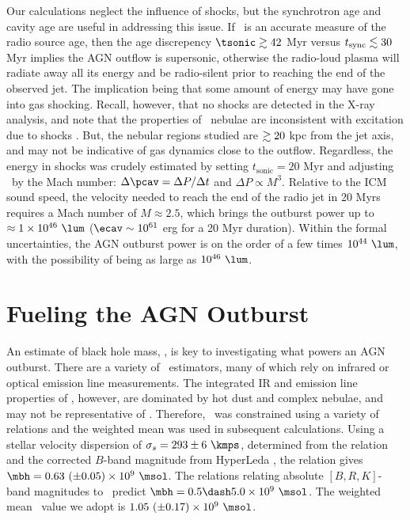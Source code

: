\documentclass[useAMS,usenatbib]{mn2e}
\begin{document}
Our calculations neglect the influence of shocks, but the synchrotron
age and cavity age are useful in addressing this issue. If \tsync\ is
an accurate measure of the radio source age, then the age discrepency
$\tsonic \ga 42$ Myr versus $t_{\mathrm{sync}} \lesssim 30$ Myr implies the AGN
outflow is supersonic, otherwise the radio-loud plasma will radiate
away all its energy and be radio-silent prior to reaching the end of
the observed jet. The implication being that some amount of energy may
have gone into gas shocking. Recall, however, that no shocks are
detected in the X-ray analysis, and note that the properties of
\irs\ nebulae are inconsistent with excitation due to shocks
\citep{1996MNRAS.283.1003C, 2000AJ....120..562T}. But, the nebular
regions studied are $\gtrsim 20$ kpc from the jet axis, and may not be
indicative of gas dynamics close to the outflow. Regardless, the
energy in shocks was crudely estimated by setting $t_{\mathrm{sonic}}
= 20$ Myr and adjusting \pcav\ by the Mach number: $\Delta \pcav =
\Delta P / \Delta t$ and $\Delta P \propto M^3$. Relative to the ICM
sound speed, the velocity needed to reach the end of the radio jet in
20 Myrs requires a Mach number of $M \approx 2.5$, which brings the
outburst power up to $\approx 1 \times 10^{46} ~\lum$ ($\ecav \sim
10^{61}$ erg for a 20 Myr duration). Within the formal uncertainties,
the AGN outburst power is on the order of a few times $10^{44} ~\lum$,
with the possibility of being as large as $10^{46} ~\lum$.

\section{Fueling the AGN Outburst}
\label{sec:fuel}

An estimate of black hole mass, \mbh, is key to investigating what
powers an AGN outburst. There are a variety of \mbh\ estimators, many
of which rely on infrared or optical emission line measurements. The
integrated IR and emission line properties of \irs, however, are
dominated by hot dust and complex nebulae, and may not be
representative of \mbh. Therefore, \mbh\ was constrained using a
variety of relations and the weighted mean was used in subsequent
calculations. Using a stellar velocity dispersion of $\sigma_s = 293
\pm 6 ~\kmps$, determined from the \citet{1976ApJ...204..668F}
relation and the corrected $B$-band magnitude from HyperLeda
\citep{hyperleda}, the \citet{2002ApJ...574..740T} relation gives
$\mbh = 0.63 ~(\pm 0.05) \times 10^9 ~\msol$. The
\citet{2007MNRAS.379..711G} relations relating absolute $[B,R,K]$-band
magnitudes to \mbh\ predict $\mbh = 0.5 \dash 5.0 \times 10^9
~\msol$. The weighted mean \mbh\ value we adopt is $1.05 ~(\pm 0.17)
\times 10^9 ~\msol$.
\end{document}
